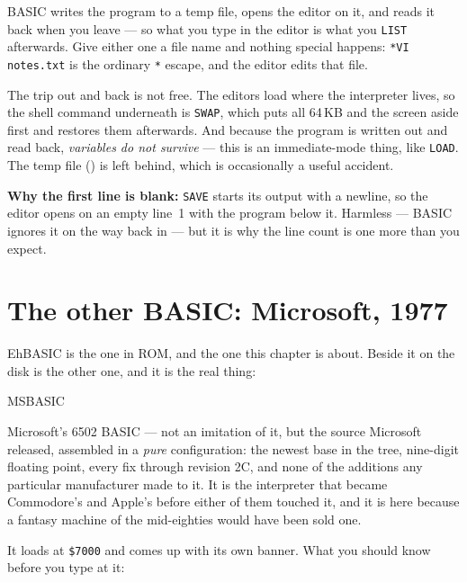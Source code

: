 \noindent BASIC writes the program to a temp file, opens the editor on it,
and reads it back when you leave --- so what you type in the editor is what
you \verb|LIST| afterwards. Give either one a file name and nothing special
happens: \verb|*VI notes.txt| is the ordinary \verb|*| escape, and the
editor edits that file.

The trip out and back is not free. The editors load where the interpreter
lives, so the shell command underneath is \verb|SWAP|, which puts all
64\,KB and the screen aside first and restores them afterwards. And because
the program is written out and read back, \emph{variables do not survive} ---
this is an immediate-mode thing, like \verb|LOAD|. The temp file
() is left behind, which is occasionally a useful accident.

\begin{aside}
\textbf{Why the first line is blank:} \verb|SAVE| starts its output with a
newline, so the editor opens on an empty line~1 with the program below it.
Harmless --- BASIC ignores it on the way back in --- but it is why the line
count is one more than you expect.
\end{aside}

\section{The other BASIC: Microsoft, 1977}\label{sec:msbasic}
EhBASIC is the one in ROM, and the one this chapter is about. Beside it
on the disk is the other one, and it is the real thing:

\begin{type}
MSBASIC
\end{type}

\noindent Microsoft's 6502 BASIC --- not an imitation of it, but the
source Microsoft released, assembled in a \emph{pure} configuration:
the newest base in the tree, nine-digit floating point, every fix
through revision 2C, and none of the additions any particular
manufacturer made to it. It is the interpreter that became Commodore's
and Apple's before either of them touched it, and it is here because a
fantasy machine of the mid-eighties would have been sold one.

It loads at \texttt{\$7000} and comes up with its own banner. What you
should know before you type at it:


